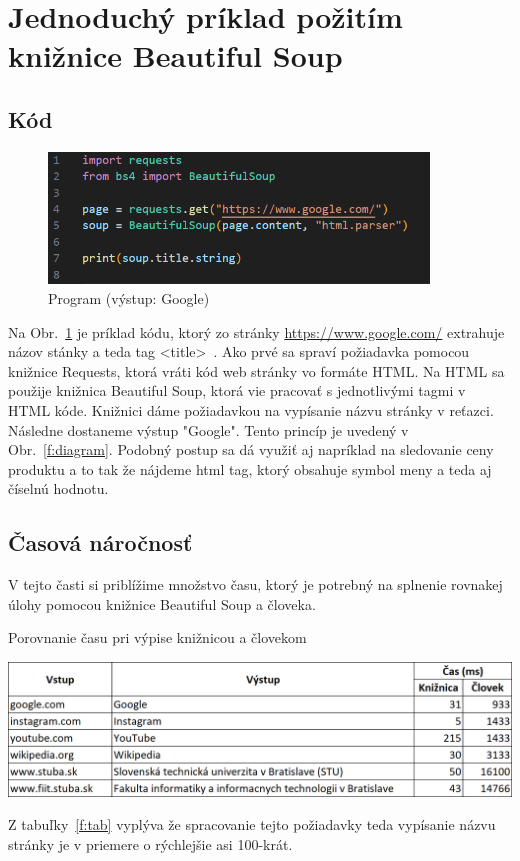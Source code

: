 \documentclass[10pt,twoside,slovak,a4paper]{article}
\begin{document}
\section{Jednoduchý príklad požitím knižnice Beautiful Soup} \label{imp}
\subsection{Kód}
\begin{figure}[tbh]
    \centering
    \includegraphics[width= 0.9\textwidth]{code.png}
    \caption{Program (výstup: Google)}
    \label{f:code}
\end{figure}

Na Obr.~\ref{f:code} je príklad kódu, ktorý zo stránky \url{https://www.google.com/} extrahuje názov stánky a teda tag \textless title\textgreater~. Ako prvé sa spraví požiadavka pomocou knižnice Requests, ktorá vráti kód web stránky vo formáte HTML. Na HTML sa použije knižnica Beautiful Soup, ktorá vie pracovať s jednotlivými tagmi v HTML kóde. Knižnici dáme požiadavkou na vypísanie názvu stránky v reťazci. Následne dostaneme výstup "Google". Tento princíp je uvedený v Obr.~\ref{f:diagram}. Podobný postup sa dá využiť aj napríklad na sledovanie ceny produktu a to tak že nájdeme html tag, ktorý obsahuje symbol meny a teda aj číselnú hodnotu.

\subsection{Časová náročnosť}
V tejto časti si priblížime množstvo času, ktorý je potrebný na splnenie rovnakej úlohy pomocou knižnice Beautiful Soup a človeka.
\begin{table}[tbh]
    \caption{Porovnanie času pri výpise knižnicou a človekom}
    \includegraphics[width= 1\textwidth]{tab.png}
    \label{f:tab}
\end{table}
Z tabuľky~\ref{f:tab} vyplýva že spracovanie tejto požiadavky teda vypísanie názvu stránky je v priemere o rýchlejšie asi 100-krát.
\end{document}
